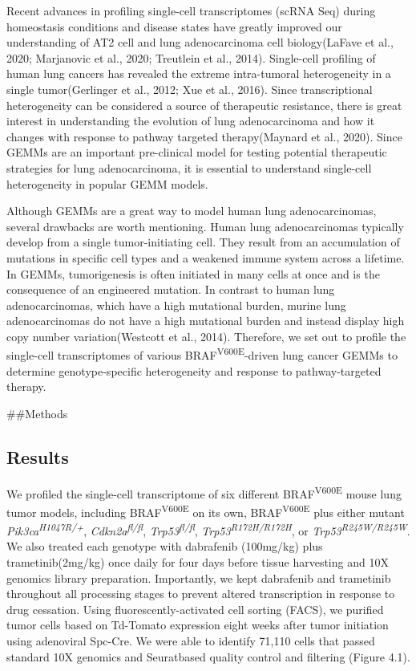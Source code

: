 Recent advances in profiling single-cell transcriptomes (scRNA Seq) during homeostasis conditions and disease states have greatly improved our understanding of AT2 cell and lung adenocarcinoma cell biology(LaFave et al., 2020; Marjanovic et al., 2020; Treutlein et al., 2014). Single-cell profiling of human lung cancers has revealed the extreme intra-tumoral heterogeneity in a single tumor(Gerlinger et al., 2012; Xue et al., 2016). Since transcriptional heterogeneity can be considered a source of therapeutic resistance, there is great interest in understanding the evolution of lung adenocarcinoma and how it changes with response to pathway targeted therapy(Maynard et al., 2020). Since GEMMs are an important pre-clinical model for testing potential therapeutic strategies for lung adenocarcinoma, it is essential to understand single-cell heterogeneity in popular GEMM models.

Although GEMMs are a great way to model human lung adenocarcinomas, several drawbacks are worth mentioning. Human lung adenocarcinomas typically develop from a single tumor-initiating cell. They result from an accumulation of mutations in specific cell types and a weakened immune system across a lifetime. In GEMMs, tumorigenesis is often initiated in many cells at once and is the consequence of an engineered mutation. In contrast to human lung adenocarcinomas, which have a high mutational burden, murine lung adenocarcinomas do not have a high mutational burden and instead display high copy number variation(Westcott et al., 2014). Therefore, we set out to profile the single-cell transcriptomes of various BRAF\textsuperscript{V600E}-driven lung cancer GEMMs to determine genotype-specific heterogeneity and response to pathway-targeted therapy.

\#\#Methods

\hypertarget{results-2}{%
\subsection{Results}\label{results-2}}

We profiled the single-cell transcriptome of six different BRAF\textsuperscript{V600E} mouse lung tumor models, including BRAF\textsuperscript{V600E} on its own, BRAF\textsuperscript{V600E} plus either mutant \emph{Pik3ca\textsuperscript{H1047R/+}}, \emph{Cdkn2a\textsuperscript{fl/fl}}, \emph{Trp53\textsuperscript{fl/fl}}, \emph{Trp53\textsuperscript{R172H/R172H}}, or \emph{Trp53\textsuperscript{R245W/R245W}}. We also treated each genotype with dabrafenib (100mg/kg) plus trametinib(2mg/kg) once daily for four days before tissue harvesting and 10X genomics library preparation. Importantly, we kept dabrafenib and trametinib throughout all processing stages to prevent altered transcription in response to drug cessation. Using fluorescently-activated cell sorting (FACS), we purified tumor cells based on Td-Tomato expression eight weeks after tumor initiation using adenoviral Spc-Cre. We were able to identify 71,110 cells that passed standard 10X genomics and Seuratbased quality control and filtering (Figure 4.1).

